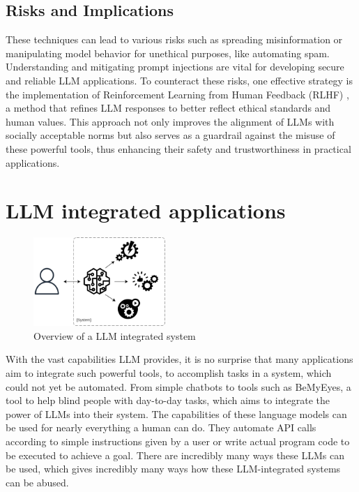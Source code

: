 \documentclass{SeminarV2}
\begin{document}
\subsection{Risks and Implications}

These techniques can lead to various risks such as spreading misinformation or manipulating model behavior for unethical purposes, like automating spam. Understanding and mitigating prompt injections are vital for developing secure and reliable LLM applications. To counteract these risks, one effective strategy is the implementation of Reinforcement Learning from Human Feedback (RLHF) \cite{ouyang2022training}, a method that refines LLM responses to better reflect ethical standards and human values. This approach not only improves the alignment of LLMs with socially acceptable norms but also serves as a guardrail against the misuse of these powerful tools, thus enhancing their safety and trustworthiness in practical applications.

\section{LLM integrated applications}

\begin{figure}[ht]
  \begin{center}
    \includegraphics[width=5cm]{image/knn1.jpg}
    \caption{Overview of a LLM integrated system}
    \label{fig:my_label}
  \end{center}
\end{figure}

With the vast capabilities LLM provides, it is no surprise that many applications aim to integrate such powerful tools, to accomplish tasks in a system, which could not yet be automated. From simple chatbots to tools such as BeMyEyes, a tool to help blind people with day-to-day tasks, which aims to integrate the power of LLMs into their system. The capabilities of these language models can be used for nearly everything a human can do. They automate API calls according to simple instructions given by a user or write actual program code to be executed to achieve a goal. There are incredibly many ways these LLMs can be used, which gives incredibly many ways how these LLM-integrated systems can be abused.
\end{document}
